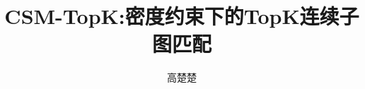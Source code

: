 \documentclass[doctor]{hnuthesis}
\title{CSM-TopK:密度约束下的TopK连续子图匹配}
\author{高楚楚}
\begin{document}
\maketitle


\tableofcontents
\begingroup
    \renewcommand*{\addvspace}[1]{}
        \listoffigures
        \newpage

        \listoftables
        \newpage
\endgroup

\mainmatter







\appendix



\backmatter

\end{document}
